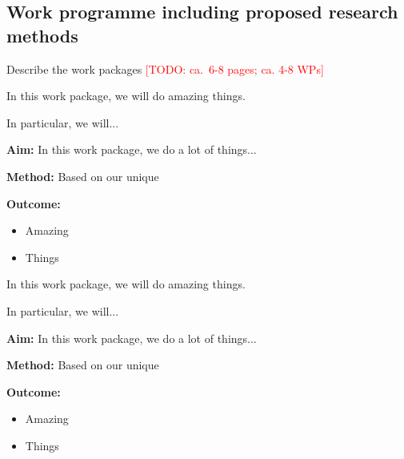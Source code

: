 \documentclass[ngerman,firsttime]{dfgproposal}
\newcommand{\todo}[1]{\xspace{\textcolor{red}{[TODO: #1]}}\xspace}
\begin{document}
	\subsection{Work programme including proposed research methods}
	Describe the work packages
	\todo{ca.\ 6-8 pages; ca. 4-8 WPs}
	
	\begin{workpackage}
		In this work package, we will do amazing things.
		
		In particular, we will...
		\blindtext
	\end{workpackage}
	\begin{wpsummary}
		\textbf{Aim:}
		In this work package, we do a lot of things...
		
		\textbf{Method:}
		Based on our unique 
		
		\textbf{Outcome:}
		\begin{itemize}
			\item Amazing
			\item Things
		\end{itemize}
	\end{wpsummary}
	
	\begin{workpackage}
		In this work package, we will do amazing things.
		
		In particular, we will...
		\blindtext
	\end{workpackage}
	\begin{wpsummary}
		\textbf{Aim:}
		In this work package, we do a lot of things...
		
		\textbf{Method:}
		Based on our unique 
		
		\textbf{Outcome:}
		\begin{itemize}
			\item Amazing
			\item Things
		\end{itemize}
	\end{wpsummary}
	
	
\end{document}

